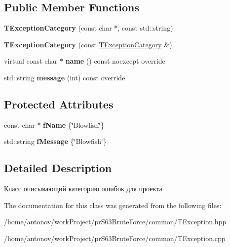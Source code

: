 \subsection*{Public Member Functions}
\begin{DoxyCompactItemize}
\item 
\mbox{\label{classexception_1_1_t_exception_category_a655bae4703e62306d2fd67e74231f62e}} 
{\bfseries T\+Exception\+Category} (const char $\ast$, const std\+::string)
\item 
\mbox{\label{classexception_1_1_t_exception_category_a0329b0ed528f7097252c54d73164755a}} 
{\bfseries T\+Exception\+Category} (const \hyperlink{classexception_1_1_t_exception_category}{T\+Exception\+Category} \&)
\item 
\mbox{\label{classexception_1_1_t_exception_category_a77a0df274e75652b6cbbe93db39eedcc}} 
virtual const char $\ast$ {\bfseries name} () const noexcept override
\item 
\mbox{\label{classexception_1_1_t_exception_category_a459d0e17bf5926de5495b5fb54af8acb}} 
std\+::string {\bfseries message} (int) const override
\end{DoxyCompactItemize}
\subsection*{Protected Attributes}
\begin{DoxyCompactItemize}
\item 
\mbox{\label{classexception_1_1_t_exception_category_a5b33773e7c3202c503d280e484bff488}} 
const char $\ast$ {\bfseries f\+Name} \{\char`\"{}Blowfish\char`\"{}\}
\item 
\mbox{\label{classexception_1_1_t_exception_category_a86453efa954f0a9a98ad44d3d537d133}} 
std\+::string {\bfseries f\+Message} \{\char`\"{}Blowfish\char`\"{}\}
\end{DoxyCompactItemize}


\subsection{Detailed Description}
Класс описывающий категорию ошибок для проекта 

The documentation for this class was generated from the following files\+:\begin{DoxyCompactItemize}
\item 
/home/antonov/work\+Project/pr\+S63\+Brute\+Force/common/T\+Exception.\+hpp\item 
/home/antonov/work\+Project/pr\+S63\+Brute\+Force/common/T\+Exception.\+cpp\end{DoxyCompactItemize}

